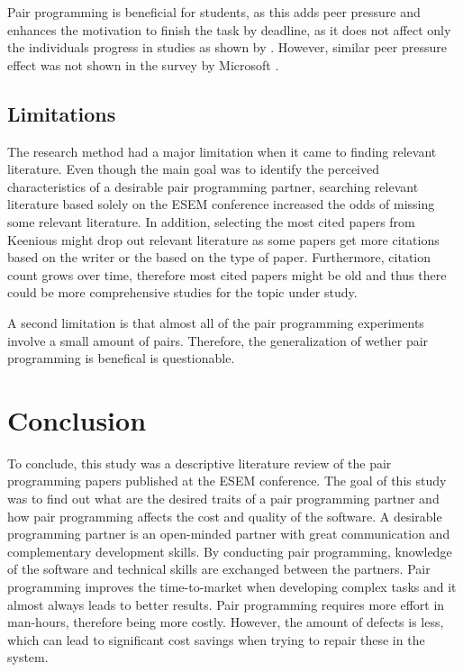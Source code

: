 \documentclass[conference]{IEEEtran}
\begin{document}
Pair programming is beneficial for students, as this adds peer pressure and enhances the motivation to finish the task by deadline, as it does not affect only the individuals progress in studies as shown by \cite{Williams2000Strengthening}. However, similar peer pressure effect was not shown in the survey by Microsoft \cite{10.1145/1414004.1414026}. 


\subsection{Limitations}

The research method had a major limitation when it came to finding relevant literature. Even though the main goal was to identify the perceived characteristics of a desirable pair programming partner, searching relevant literature based solely on the ESEM conference increased the odds of missing some relevant literature. In addition, selecting the most cited papers from Keenious might drop out relevant literature as some papers get more citations based on the writer or the based on the type of paper. Furthermore, citation count grows over time, therefore most cited papers might be old and thus there could be more comprehensive studies for the topic under study.

A second limitation is that almost all of the pair programming experiments involve a small amount of pairs. Therefore, the generalization of wether pair programming is benefical is questionable.

\section{Conclusion}

To conclude, this study was a descriptive literature review of the pair programming papers published at the ESEM conference. The goal of this study was to find out what are the desired traits of a pair programming partner and how pair programming affects the cost and quality of the software. A desirable programming partner is an open-minded partner with great communication and complementary development skills. By conducting pair programming, knowledge of the software and technical skills are exchanged between the partners. Pair programming improves the time-to-market when developing complex tasks and it almost always leads to better results. Pair programming requires more effort in man-hours, therefore being more costly. However, the amount of defects is less, which can lead to significant cost savings when trying to repair these in the system. 






\end{document}
